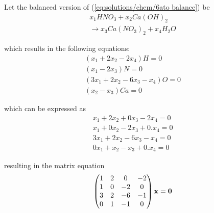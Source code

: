 Let the balanced version of (\ref{eq:solutions/chem/6ato balance}) be
\begin{multline}
    \label{eq:solutions/chem/6abalanced}x_{1}HNO_{3}+ x_{2}Ca(OH)_{2} \\ \to x_{3}Ca(NO_{3})_{2}+ x_{4}H_{2}O
\end{multline}

which results in the following equations:
\begin{align}
    (x_{1}+ 2x_{2}-2x_{4}) H= 0\\
    (x_{1}-2x_{3}) N= 0\\
    (3x_{1}+ 2x_{2}-6x_{3}- x_{4}) O=0\\
    (x_{2}-x_{3}) Ca= 0
\end{align}

which can be expressed as
\begin{align}
    x_{1}+ 2x_{2}+ 0 x_{3} -2x_{4} = 0\\
    x_{1}+ 0 x_{2} -2x_{3} +0.x_{4}= 0\\
    3x_{1}+ 2x_{2}-6x_{3}- x_{4} =0\\
    0 x_{1} +x_{2}-x_{3} +0.x_{4}= 0
\end{align}

resulting in the matrix equation
\begin{align}
    \label{eq:solutions/chem/6a matrix}
    \begin{pmatrix} 1 & 2 & 0 & -2\\
           1 & 0 & -2 & 0\\
           3 & 2 & -6 & -1\\
           0 & 1 & -1 & 0\end{pmatrix}\mathbf{x}
           =\mathbf{0}
\end{align}

